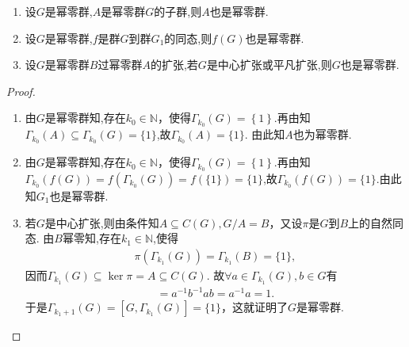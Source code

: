 \documentclass[../../main.tex]{subfiles}%
\begin{document}
\begin{theorem}\label{theorem:幂零群的基本结论--抽象代数}
\begin{enumerate}[(1)]
\item\label{theorem:幂零群的基本结论--抽象代数-1} 设$G$是幂零群,$A$是幂零群$G$的子群,则$A$也是幂零群.

\item\label{theorem:幂零群的基本结论--抽象代数-2} 设$G$是幂零群,$f$是群$G$到群$G_1$的同态,则$f(G)$也是幂零群.

\item\label{theorem:幂零群的基本结论--抽象代数-3} 设$G$是幂零群$B$过幂零群$A$的扩张,若$G$是中心扩张或平凡扩张,则$G$也是幂零群.
\end{enumerate}
\end{theorem}
\begin{proof}
\begin{enumerate}[(1)]
\item 由$G$是幂零群知,存在$k_0\in \mathbb{N}$，使得$\Gamma_{k_0}(G)=\left\{ 1 \right\}.$再由知$\Gamma_{k_0}(A) \subseteq \Gamma_{k_0}(G)=\{1\}$,故$\Gamma_{k_0}(A)=\{1\}$. 由此知$A$也为幂零群. 

\item 由$G$是幂零群知,存在$k_0\in \mathbb{N}$，使得$\Gamma_{k_0}(G)=\left\{ 1 \right\}.$再由知$\Gamma_{k_0}(f(G)) = f(\Gamma_{k_0}(G))=f(\{1\})=\{1\}$,故$\Gamma_{k_0}(f(G))=\{1\}$.由此知$G_1$也是幂零群.

\item 若$G$是中心扩张,则由条件知$A \subseteq C(G), G/A = B$，又设$\pi$是$G$到$B$上的自然同态. 由$B$幂零知,存在$k_1\in \mathbb{N}$,使得
\begin{align*}
\pi(\Gamma_{k_1}(G)) = \Gamma_{k_1}(B) = \{1\},
\end{align*}
因而$\Gamma_{k_1}(G) \subseteq \ker\pi = A \subseteq C(G)$. 故$\forall a \in \Gamma_{k_1}(G), b \in G$有
\begin{align*}
[a, b] =a^{-1}b^{-1}ab=a^{-1}a= 1.
\end{align*}
于是$\Gamma_{k_1 + 1}(G) = [G, \Gamma_{k_1}(G)] = \{1\}$，这就证明了$G$是幂零群.


\end{enumerate}
\end{proof}
\end{document}
